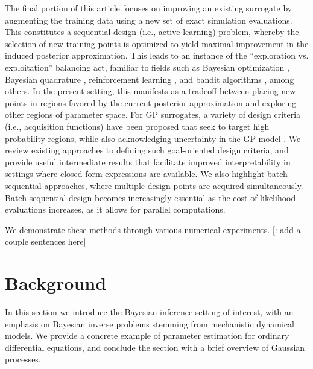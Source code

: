 \documentclass[12pt]{article}
\begin{document}
The final portion of this article focuses on improving an existing surrogate by augmenting the training data 
using a new set of exact simulation evaluations. This constitutes a sequential design (i.e., active learning) problem, 
whereby the selection of new training points is optimized to yield maximal improvement in the induced 
posterior approximation. This leads to an instance of the ``exploration vs. exploitation'' balancing act,
familiar to fields such as Bayesian optimization \citep{reviewBayesOpt}, Bayesian quadrature 
\citep{BayesQuadrature,BayesQuadratureAL,BayesQuadRatios,quadratureLogGP}, reinforcement learning 
\citep{BadiaRL,LiuRL}, and bandit algorithms \citep{banditsEmpirical,LattimoreBandits}, among others.
In the present setting, this 
manifests as a tradeoff between placing new points in regions favored by the current posterior approximation
and exploring other regions of parameter space. For GP surrogates, a variety of 
design criteria (i.e., acquisition functions) have been proposed that seek to target high probability regions, 
while also acknowledging uncertainty in the GP model 
\citep{SinsbeckNowak,Surer2023sequential,KandasamyActiveLearning2015,weightedIVAR,VehtariParallelGP,VillaniAdaptiveGP}.
We review existing approaches to defining such goal-oriented design criteria, and provide useful intermediate results that 
facilitate improved interpretability in settings where closed-form expressions are available.
We also highlight batch sequential approaches, where multiple design points are acquired simultaneously. 
Batch sequential design becomes increasingly essential as the cost of likelihood evaluations increases, as it allows for 
parallel computations. 

We demonstrate these methods through various numerical experiments. [\todo: add a couple sentences here]

\section{Background}
In this section we introduce the Bayesian inference setting of interest, with an emphasis on Bayesian inverse problems
stemming from mechanistic dynamical models. We provide a concrete example of parameter estimation for ordinary 
differential equations, and conclude the section with a brief overview of Gaussian processes.
 
\end{document}
